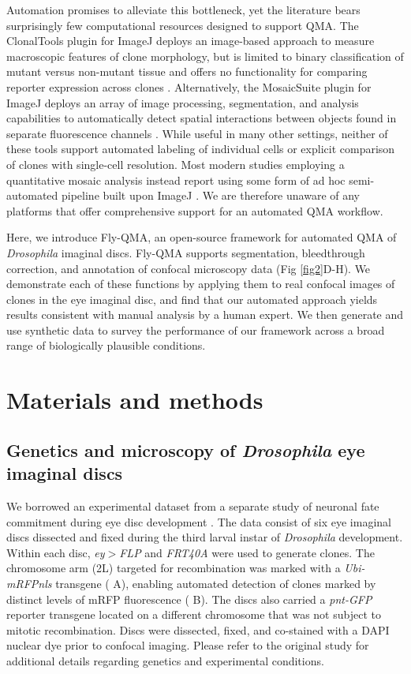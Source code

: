 \documentclass[10pt,letterpaper]{article}
\begin{document}
Automation promises to alleviate this bottleneck, yet the literature bears surprisingly few computational resources designed to support QMA. The ClonalTools plugin for ImageJ deploys an image-based approach to measure macroscopic features of clone morphology, but is limited to binary classification of mutant versus non-mutant tissue and offers no functionality for comparing reporter expression across clones \cite{Mort2009}. Alternatively, the MosaicSuite plugin for ImageJ deploys an array of image processing, segmentation, and analysis capabilities to automatically detect spatial interactions between objects found in separate fluorescence channels \cite{Helmuth2010,Shivanandan2013}. While useful in many other settings, neither of these tools support automated labeling of individual cells or explicit comparison of clones with single-cell resolution. Most modern studies employing a quantitative mosaic analysis instead report using some form of ad hoc semi-automated pipeline built upon ImageJ \cite{Dai2017,Ghiglione2018,Li2018}. We are therefore unaware of any platforms that offer comprehensive support for an automated QMA workflow.

Here, we introduce Fly-QMA, an open-source framework for automated QMA of \textit{Drosophila} imaginal discs. Fly-QMA supports segmentation, bleedthrough correction, and annotation of confocal microscopy data (Fig \ref{fig2}D-H). We demonstrate each of these functions by applying them to real confocal images of clones in the eye imaginal disc, and find that our automated approach yields results consistent with manual analysis by a human expert. We then generate and use synthetic data to survey the performance of our framework across a broad range of biologically plausible conditions.



\section*{Materials and methods}

\subsection*{Genetics and microscopy of \textit{Drosophila} eye imaginal discs}

We borrowed an experimental dataset from a separate study of neuronal fate commitment during eye disc development \cite{Bernasek2018}. The data consist of six eye imaginal discs dissected and fixed during the third larval instar of \textit{Drosophila} development. Within each disc, \textit{ey$>$FLP} and \textit{FRT40A} were used to generate clones. The chromosome arm (2L) targeted for recombination was marked with a \textit{Ubi-mRFPnls} transgene (  A), enabling automated detection of clones marked by distinct levels of mRFP fluorescence (  B). The discs also carried a \textit{pnt-GFP} reporter transgene located on a different chromosome that was not subject to mitotic recombination. Discs were dissected, fixed, and co-stained with a DAPI nuclear dye prior to confocal imaging. Please refer to the original study for additional details regarding genetics and experimental conditions. 
\end{document}
